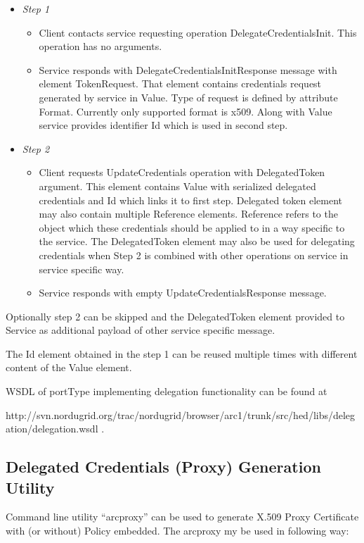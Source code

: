 \documentclass{article}                            %
\begin{document}
    \begin{itemize}
        \item \emph{Step 1}
            \begin{itemize}
                \item Client contacts service requesting operation DelegateCredentialsInit. This operation has no arguments.
                \item Service responds with DelegateCredentialsInitResponse message with element TokenRequest. That element contains credentials request generated by service in Value. Type of request is defined by attribute Format. Currently only supported format is x509. Along with Value service provides identifier Id which is used in second step.
            \end{itemize}
        \item \emph{Step 2}
            \begin{itemize}
                \item Client requests UpdateCredentials operation with DelegatedToken argument. This element contains Value with serialized delegated credentials and Id which links it to first step. Delegated token element may also contain multiple Reference elements. Reference refers to the object which these credentials should be applied to in a way specific to the service. The DelegatedToken element may also be used for delegating credentials when Step 2 is combined with other operations on service in service specific way.
                \item Service responds with empty UpdateCredentialsResponse message.
            \end{itemize}
    \end{itemize}
Optionally step 2 can be skipped and the DelegatedToken element provided to Service as additional payload of other service specific message.

The Id element obtained in the step 1 can be reused multiple times with different content of the Value element.

WSDL of portType implementing delegation functionality can be found at

http://svn.nordugrid.org/trac/nordugrid/browser/arc1/trunk/src/hed/libs/delegation/delegation.wsdl .


\subsection{Delegated Credentials (Proxy) Generation Utility} %
\label{subsec:delegation_client}
Command line utility “arcproxy” can be used to generate X.509 Proxy Certificate with (or without)  Policy embedded.
The arcproxy my be used in following way:
\end{document}

